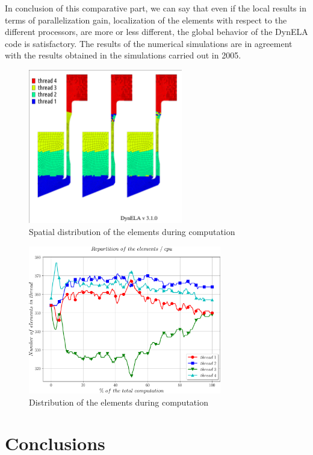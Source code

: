 In conclusion of this comparative part, we can say that even if the local results in terms of parallelization gain, localization of the elements with respect to the different processors, are more or less different, the global behavior of the DynELA code is satisfactory. The results of the numerical simulations are in agreement with the results obtained in the simulations carried out in 2005.

\begin{figure}[h!] 
  \centering
  \includegraphics[width=0.6\textwidth]{./spacethreads.pdf}
  \caption{Spatial distribution of the elements during computation}
  \label{spacethreads}
\end{figure}

\begin{figure}[h!] 
  \centering
  \includegraphics[width=0.75\textwidth]{./timethreads.pdf}
  \caption{Distribution of the elements during computation}
  \label{timethreads}
\end{figure}

\section {Conclusions}

